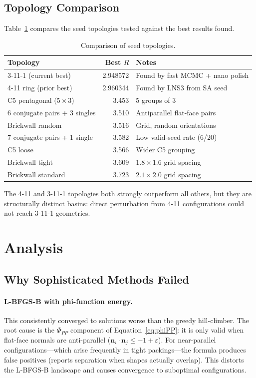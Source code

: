 \documentclass[11pt]{article}
\begin{document}
\subsection{Topology Comparison}

Table~\ref{tab:topologies} compares the seed topologies tested against the best results found.

\begin{table}[t]
\centering
\caption{Comparison of seed topologies.}
\label{tab:topologies}
\begin{tabular}{@{}lrl@{}}
\toprule
Topology & Best $R$ & Notes \\
\midrule
3-11-1 (current best) & 2.948572 & Found by fast MCMC + nano polish \\
4-11 ring (prior best) & 2.960344 & Found by LNS3 from SA seed \\
C5 pentagonal ($5\times3$) & 3.453 & 5 groups of 3 \\
6 conjugate pairs + 3 singles & 3.510 & Antiparallel flat-face pairs \\
Brickwall random & 3.516 & Grid, random orientations \\
7 conjugate pairs + 1 single & 3.582 & Low valid-seed rate (6/20) \\
C5 loose & 3.566 & Wider C5 grouping \\
Brickwall tight & 3.609 & $1.8 \times 1.6$ grid spacing \\
Brickwall standard & 3.723 & $2.1 \times 2.0$ grid spacing \\
\bottomrule
\end{tabular}
\end{table}

The 4-11 and 3-11-1 topologies both strongly outperform all others, but they are structurally distinct basins: direct perturbation from 4-11 configurations could not reach 3-11-1 geometries.

\section{Analysis}
\label{sec:analysis}

\subsection{Why Sophisticated Methods Failed}

\paragraph{L-BFGS-B with phi-function energy.}
This consistently converged to solutions worse than the greedy hill-climber.
The root cause is the $\Phi_{PP}$ component of Equation~\eqref{eq:phiPP}: it is only valid when flat-face normals are anti-parallel ($\mathbf{n}_i \cdot \mathbf{n}_j \le -1 + \varepsilon$).
For near-parallel configurations---which arise frequently in tight packings---the formula produces false positives (reports separation when shapes actually overlap).
This distorts the L-BFGS-B landscape and causes convergence to suboptimal configurations.
\end{document}
